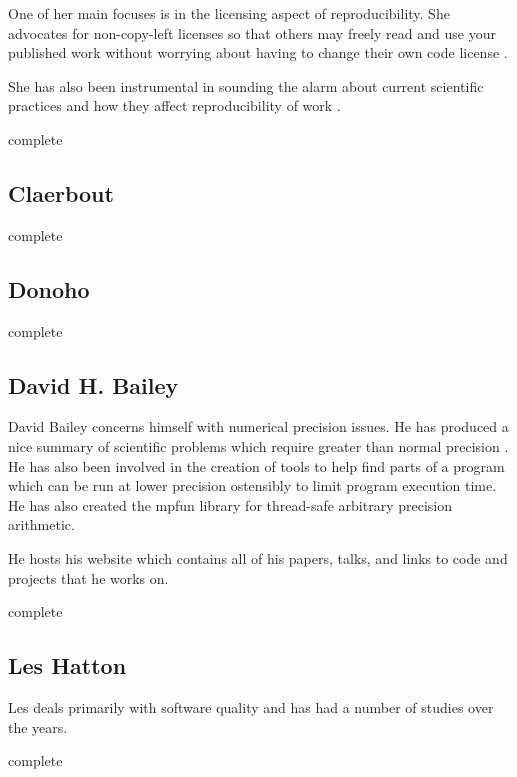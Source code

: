 \documentclass[american]{article}
\newcommand{\complete}{
	\gls{complete}
}
\begin{document}
One of her main focuses is in the licensing aspect of reproducibility. She advocates for non-copy-left licenses so that others may freely read and use your published work without worrying about having to change their own code license \cite{stodden-legal-framework-reproducible-2009}.

She has also been instrumental in sounding the alarm about current scientific practices and how they affect reproducibility of work \cite{stodden-reproducibility-crisis}.

\complete

\subsection{Claerbout} \label{sec:authors-claerbout}

\complete

\subsection{Donoho} \label{sec:authors-donoho}

\complete

\subsection{David H. Bailey} \label{sec:authors-bailey}

David Bailey concerns himself with numerical precision issues. He has produced a nice summary of scientific problems which require greater than normal precision \cite{high-precision-arith-in-science,dhb-zurich-hp}. He has also been involved in the creation of tools to help find parts of a program which can be run at lower precision ostensibly to limit program execution time\cite{blame-analysis}. He has also created the mpfun library for thread-safe arbitrary precision arithmetic\cite{mpfun}.

He hosts his website\cite{david-bailey-site} which contains all of his papers, talks, and links to code and projects that he works on.

\complete

\subsection{Les Hatton} \label{sec:authors-hatton}

Les deals primarily with software quality and has had a number of studies over the years.

\complete
\end{document}
